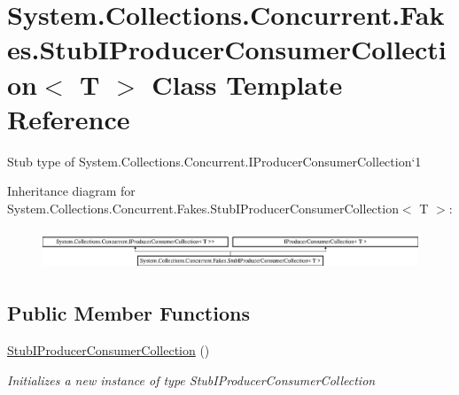 \hypertarget{class_system_1_1_collections_1_1_concurrent_1_1_fakes_1_1_stub_i_producer_consumer_collection_3_01_t_01_4}{\section{System.\-Collections.\-Concurrent.\-Fakes.\-Stub\-I\-Producer\-Consumer\-Collection$<$ T $>$ Class Template Reference}
\label{class_system_1_1_collections_1_1_concurrent_1_1_fakes_1_1_stub_i_producer_consumer_collection_3_01_t_01_4}
}


Stub type of System.\-Collections.\-Concurrent.\-I\-Producer\-Consumer\-Collection`1 


Inheritance diagram for System.\-Collections.\-Concurrent.\-Fakes.\-Stub\-I\-Producer\-Consumer\-Collection$<$ T $>$\-:\begin{figure}[H]
\begin{center}
\leavevmode
\includegraphics[height=1.214751cm]{class_system_1_1_collections_1_1_concurrent_1_1_fakes_1_1_stub_i_producer_consumer_collection_3_01_t_01_4}
\end{center}
\end{figure}
\subsection*{Public Member Functions}
\begin{DoxyCompactItemize}
\item 
\hyperlink{class_system_1_1_collections_1_1_concurrent_1_1_fakes_1_1_stub_i_producer_consumer_collection_3_01_t_01_4_a9ff90e122c915daede63bd8c2324f6eb}{Stub\-I\-Producer\-Consumer\-Collection} ()
\begin{DoxyCompactList}\small\item\em Initializes a new instance of type Stub\-I\-Producer\-Consumer\-Collection\end{DoxyCompactList}\end{DoxyCompactItemize}
